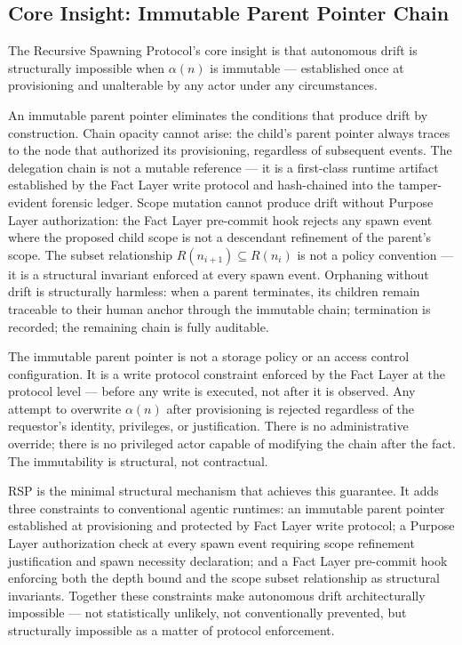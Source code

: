 \subsection{Core Insight: Immutable Parent Pointer Chain}
\label{sec:rs-intro-insight}

The Recursive Spawning Protocol's core insight is that autonomous drift is structurally impossible when $\alpha(n)$ is immutable — established once at provisioning and unalterable by any actor under any circumstances.

An immutable parent pointer eliminates the conditions that produce drift by construction. Chain opacity cannot arise: the child's parent pointer always traces to the node that authorized its provisioning, regardless of subsequent events. The delegation chain is not a mutable reference — it is a first-class runtime artifact established by the Fact Layer write protocol and hash-chained into the tamper-evident forensic ledger. Scope mutation cannot produce drift without Purpose Layer authorization: the Fact Layer pre-commit hook rejects any spawn event where the proposed child scope is not a descendant refinement of the parent's scope. The subset relationship $R(n_{i+1}) \subseteq R(n_i)$ is not a policy convention — it is a structural invariant enforced at every spawn event. Orphaning without drift is structurally harmless: when a parent terminates, its children remain traceable to their human anchor through the immutable chain; termination is recorded; the remaining chain is fully auditable.

The immutable parent pointer is not a storage policy or an access control configuration. It is a write protocol constraint enforced by the Fact Layer at the protocol level — before any write is executed, not after it is observed. Any attempt to overwrite $\alpha(n)$ after provisioning is rejected regardless of the requestor's identity, privileges, or justification. There is no administrative override; there is no privileged actor capable of modifying the chain after the fact. The immutability is structural, not contractual.

RSP is the minimal structural mechanism that achieves this guarantee. It adds three constraints to conventional agentic runtimes: an immutable parent pointer established at provisioning and protected by Fact Layer write protocol; a Purpose Layer authorization check at every spawn event requiring scope refinement justification and spawn necessity declaration; and a Fact Layer pre-commit hook enforcing both the depth bound and the scope subset relationship as structural invariants. Together these constraints make autonomous drift architecturally impossible — not statistically unlikely, not conventionally prevented, but structurally impossible as a matter of protocol enforcement.

